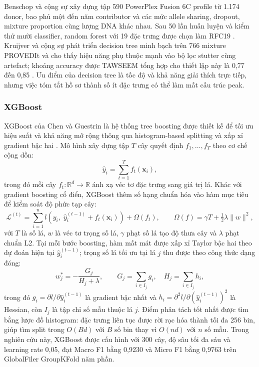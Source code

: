 \documentclass[12pt,a4paper]{article}
\begin{document}
Benschop và cộng sự xây dựng tập 590 PowerPlex Fusion 6C profile từ 1.174 donor, bao phủ một đến năm contributor và các mức allele sharing, dropout, mixture proportion cùng lượng DNA khác nhau. Sau 50 lần huấn luyện và kiểm thử mười classifier, random forest với 19 đặc trưng được chọn làm RFC19 \cite{benschop2019,alamoudi2022}. Kruijver và cộng sự phát triển decision tree minh bạch trên 766 mixture PROVEDIt và cho thấy hiệu năng phụ thuộc mạnh vào bộ lọc stutter cùng artefact; khoảng accuracy được TAWSEEM tổng hợp cho thiết lập này là 0,77 đến 0,85 \cite{kruijver2021,alamoudi2022}. Ưu điểm của decision tree là tốc độ và khả năng giải thích trực tiếp, nhưng việc tóm tắt hồ sơ thành số ít đặc trưng có thể làm mất cấu trúc peak.

\subsubsection{XGBoost}

XGBoost của Chen và Guestrin là hệ thống tree boosting được thiết kế để tối ưu hiệu suất và khả năng mở rộng thông qua histogram-based splitting và xấp xỉ gradient bậc hai \cite{chen2016}. Mô hình xây dựng tập $T$ cây quyết định $f_1, \ldots, f_T$ theo cơ chế cộng dồn:
\begin{equation}
\hat{y}_i = \sum_{t=1}^{T} f_t(\bm{x}_i),
\end{equation}
trong đó mỗi cây $f_t : \mathbb{R}^d \to \mathbb{R}$ ánh xạ véc tơ đặc trưng sang giá trị lá. Khác với gradient boosting cổ điển, XGBoost thêm số hạng chuẩn hóa vào hàm mục tiêu để kiểm soát độ phức tạp cây:
\begin{equation}
\mathcal{L}^{(t)} = \sum_{i=1}^{n} l\!\left(y_i,\; \hat{y}_i^{(t-1)} + f_t(\bm{x}_i)\right) + \Omega(f_t),
\qquad \Omega(f) = \gamma T + \tfrac{1}{2}\lambda \|w\|^2,
\end{equation}
với $T$ là số lá, $w$ là véc tơ trọng số lá, $\gamma$ phạt số lá tạo độ thưa cây và $\lambda$ phạt chuẩn L2. Tại mỗi bước boosting, hàm mất mát được xấp xỉ Taylor bậc hai theo dự đoán hiện tại $\hat{y}_i^{(t-1)}$; trọng số lá tối ưu tại lá $j$ thu được theo công thức dạng đóng:
\begin{equation}
w_j^* = -\frac{G_j}{H_j + \lambda},
\qquad G_j = \sum_{i \in I_j} g_i, \quad H_j = \sum_{i \in I_j} h_i,
\end{equation}
trong đó $g_i = \partial l/\partial \hat{y}_i^{(t-1)}$ là gradient bậc nhất và $h_i = \partial^2 l/\partial(\hat{y}_i^{(t-1)})^2$ là Hessian, còn $I_j$ là tập chỉ số mẫu thuộc lá $j$. Điểm phân tách tốt nhất được tìm bằng lược đồ histogram: đặc trưng liên tục được rời rạc hóa thành tối đa 256 bin, giúp tìm split trong $O(Bd)$ với $B$ số bin thay vì $O(nd)$ với $n$ số mẫu. Trong nghiên cứu này, XGBoost được cấu hình với 300 cây, độ sâu tối đa sáu và learning rate 0,05, đạt Macro F1 bằng 0,9230 và Micro F1 bằng 0,9763 trên GlobalFiler GroupKFold năm phần.
\end{document}
